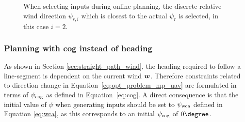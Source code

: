 \begin{figure}
    \centering
    \caption{When selecting inputs during online planning, the discrete relative wind direction $\psi_{r,i}$ which is closest to the actual $\psi_r$ is selected, in this case $i=2$.}
    \label{fig:discrete_wind}
\end{figure}

\subsubsection{Planning with \ac{cog} instead of heading}
As shown in Section \ref{sec:straight_path_wind}, the heading required to follow a line-segment is dependent on the current wind $\boldsymbol{w}$. 
Therefore constraints related to direction change in Equation~\eqref{eq:opt_problem_mp_uav} are formulated in terms of $\psi_{\text{cog}}$ as defined in Equation~\eqref{eq:cog}.
A direct consequence is that the initial value of $\psi$ when generating inputs should be 
set to $\psi_{\text{wca}}$ defined in Equation \eqref{eq:wca}, as this corresponds to an initial $\psi_{\text{cog}}$ of $0\degree$.

